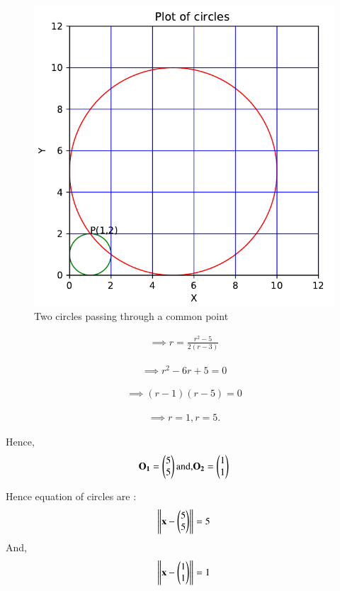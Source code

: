 \documentclass[journal,12pt,twocolumn]{IEEEtran}
\begin{document}
\begin{figure}[htb!]	
	\centering	
	\includegraphics[width=.50 \textwidth, height=.30\textheight]{figure1.pdf}	
	\caption{Two circles passing through a common point}
	\label{fig1}	
\end{figure}

\begin{align}
 \implies r  =  \frac{r^2 - 5}{2 \left(r - 3\right)} 
\end{align}


\begin{align}
\implies r^2 - 6r +5 = 0
\end{align}


\begin{align}
\implies \left( r -1\right) \left( r- 5\right) = 0
\end{align}

\begin{align}
\implies r = 1, r = 5.
\end{align}

Hence,
\begin{align}
\mathbf{O_1} = \begin{pmatrix}5 \\ 5 \\\end{pmatrix} \text{and,}  \mathbf{O_2} = \begin{pmatrix}1 \\ 1 \\\end{pmatrix}
\end{align}

Hence equation of circles are :
\begin{align}
\left\lVert\mathbf{x} - \begin{pmatrix}5 \\ 5 \\\end{pmatrix}\right\rVert = 5
\end{align}
And,
\begin{align}
\left\lVert\mathbf{x} - \begin{pmatrix}1 \\ 1 \\\end{pmatrix}\right\rVert = 1
\end{align}
\end{document}

